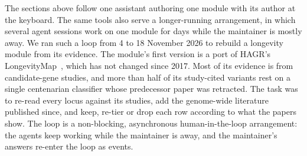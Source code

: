 \documentclass[11pt,a4paper]{article}
\begin{document}
The sections above follow one assistant authoring one module with its author
at the keyboard. The same tools also serve a longer-running arrangement, in
which several agent sessions work on one module for days while the maintainer
is mostly away. We ran such a loop from 4 to 18 November 2026 to rebuild a
longevity module from its evidence. The module's first version is a port of
HAGR's LongevityMap~\citep{budovsky2013longevitymap}, which has not changed
since 2017. Most of its evidence is from candidate-gene studies, and more than
half of its study-cited variants rest on a single centenarian classifier whose
predecessor paper was retracted. The task was to re-read every locus against
its studies, add the genome-wide literature published since, and keep, re-tier
or drop each row according to what the papers show. The loop is a
non-blocking, asynchronous human-in-the-loop arrangement: the agents keep
working while the maintainer is away, and the maintainer's answers re-enter
the loop as events.
\end{document}
